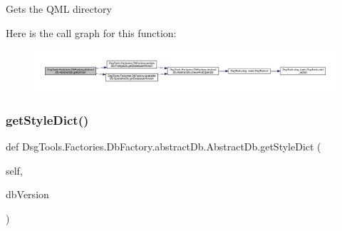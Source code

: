 \begin{DoxyVerb}Gets the QML directory
\end{DoxyVerb}
 Here is the call graph for this function\+:
\nopagebreak
\begin{figure}[H]
\begin{center}
\leavevmode
\includegraphics[width=350pt]{class_dsg_tools_1_1_factories_1_1_db_factory_1_1abstract_db_1_1_abstract_db_a8dcc86de5ba1fb426c1e022b0be14826_cgraph}
\end{center}
\end{figure}
\mbox{\label{class_dsg_tools_1_1_factories_1_1_db_factory_1_1abstract_db_1_1_abstract_db_acfeaf4a5658a8ec9aa3adcf74f8a2ab9}} 
\subsubsection{\texorpdfstring{get\+Style\+Dict()}{getStyleDict()}}
{\footnotesize\ttfamily def Dsg\+Tools.\+Factories.\+Db\+Factory.\+abstract\+Db.\+Abstract\+Db.\+get\+Style\+Dict (\begin{DoxyParamCaption}\item[{}]{self,  }\item[{}]{db\+Version }\end{DoxyParamCaption})}

